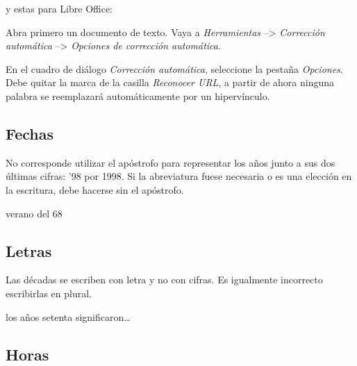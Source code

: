 \documentclass{book}
\begin{document}
{{{{{{{\noindent y estas para Libre Office:

\begin{mdframed}[linewidth=.5pt,linecolor=black!30,roundcorner=3pt,backgroundcolor=yellow!15]
\begin{myquote}
Abra primero un documento de texto. Vaya a \emph{Herramientas} --> \emph{Corrección automática} --> \emph{Opciones de corrección automática}.

En el cuadro de diálogo \emph{Corrección automática}, seleccione la pestaña \emph{Opciones}. Debe quitar la marca de la casilla \emph{Reconocer URL}, a partir de ahora ninguna palabra se reemplazará automáticamente por un hipervínculo.
\end{myquote}
\end{mdframed}

\subsection{Fechas}

No corresponde utilizar el apóstrofo para representar los años junto a sus dos últimas cifras: '98 por 1998. Si la abreviatura fuese necesaria o es una elección en la escritura, debe hacerse sin el apóstrofo.

\begin{mdframed}[linewidth=.5pt,linecolor=black!30,roundcorner=3pt,backgroundcolor=yellow!15]
\begin{compactitem}
\item verano del 68
\end{compactitem}
\end{mdframed}

\subsection{Letras}

Las décadas se escriben con letra y no con cifras. Es igualmente incorrecto escribirlas en plural.

\begin{mdframed}[linewidth=.5pt,linecolor=black!30,roundcorner=3pt,backgroundcolor=yellow!15]
\begin{compactitem}
\item los años setenta significaron\dots
\end{compactitem}
\end{mdframed}

\subsection{Horas}

}}}}}}}
\end{document}
